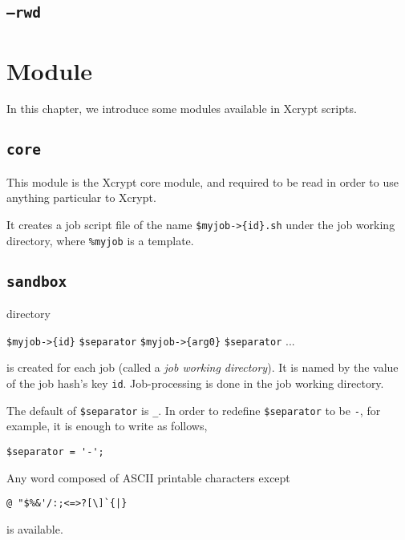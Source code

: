 \documentclass[a4paper,10pt]{report}
\begin{document}
\section{\texttt{--rwd}}

\chapter{Module}\label{chapmodule}

In this chapter, we introduce some modules available in Xcrypt scripts.

\section{\texttt{core}}

This module is the Xcrypt core module, and required to be read in
order to use anything particular to Xcrypt.

It creates a job script file of the name \texttt{\$myjob->\{id\}.sh}
under the job working directory, where \texttt{\%myjob} is a template.

\section{\texttt{sandbox}}

directory

\begin{center}
 \texttt{\$myjob->\{id\}} \texttt{\$separator}
 \texttt{\$myjob->\{arg0\}} \texttt{\$separator} ...
\end{center}

is created for each job (called a \textit{job working directory}).  It is
named by the value of the job hash's key \texttt{id}.  Job-processing
is done in the job working directory.

The default of \texttt{\$separator} is \texttt{\_}.  In order to
redefine \texttt{\$separator} to be \texttt{-}, for example, it is
enough to write as follows,
\begin{boxnote}
\begin{verbatim}
$separator = '-';
\end{verbatim}
\end{boxnote}
\vspace{\baselineskip}

Any word composed of ASCII printable characters except
\begin{center}
\verb*+@ "$%&'/:;<=>?[\]`{|}+        %
\end{center}
is available.
\end{document}
